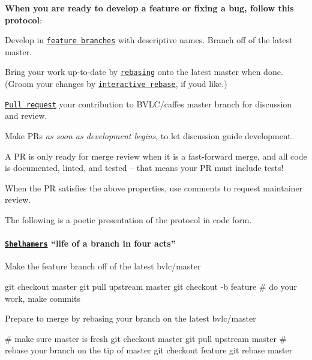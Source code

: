 {\bfseries When you are ready to develop a feature or fixing a bug, follow this protocol}\+:


\begin{DoxyItemize}
\item Develop in \href{https://www.atlassian.com/git/workflows#!workflow-feature-branch}{\tt feature branches} with descriptive names. Branch off of the latest {\ttfamily master}.
\item Bring your work up-\/to-\/date by \href{http://git-scm.com/book/en/Git-Branching-Rebasing}{\tt rebasing} onto the latest {\ttfamily master} when done. (Groom your changes by \href{https://help.github.com/articles/interactive-rebase}{\tt interactive rebase}, if you\textquotesingle{}d like.)
\item \href{https://help.github.com/articles/using-pull-requests}{\tt Pull request} your contribution to {\ttfamily B\+V\+L\+C/caffe}\textquotesingle{}s {\ttfamily master} branch for discussion and review.
\begin{DoxyItemize}
\item Make P\+Rs {\itshape as soon as development begins}, to let discussion guide development.
\item A PR is only ready for merge review when it is a fast-\/forward merge, and all code is documented, linted, and tested -- that means your PR must include tests!
\end{DoxyItemize}
\item When the PR satisfies the above properties, use comments to request maintainer review.
\end{DoxyItemize}

The following is a poetic presentation of the protocol in code form.

\paragraph*{\href{https://github.com/shelhamer}{\tt Shelhamer\textquotesingle{}s} “life of a branch in four acts”}

Make the {\ttfamily feature} branch off of the latest {\ttfamily bvlc/master} \begin{DoxyVerb}git checkout master
git pull upstream master
git checkout -b feature
# do your work, make commits
\end{DoxyVerb}


Prepare to merge by rebasing your branch on the latest {\ttfamily bvlc/master} \begin{DoxyVerb}# make sure master is fresh
git checkout master
git pull upstream master
# rebase your branch on the tip of master
git checkout feature
git rebase master
\end{DoxyVerb}


